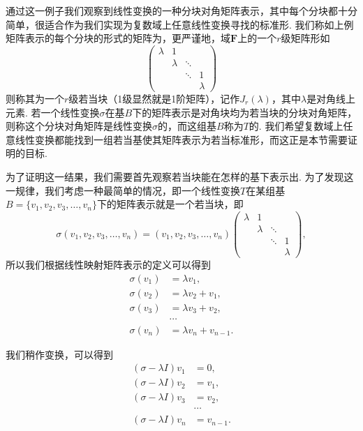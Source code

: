 通过这一例子我们观察到线性变换的一种分块对角矩阵表示，其中每个分块都十分简单，很适合作为我们实现为复数域上任意线性变换寻找的标准形. 我们称如上例矩阵表示的每个分块的形式的矩阵为，更严谨地，域$\mathbf{F}$上的一个$r$级矩阵形如\[\begin{pmatrix}
        \lambda & 1       &        &         \\
                & \lambda & \ddots &         \\
                &         & \ddots & 1       \\
                &         &        & \lambda
    \end{pmatrix}\]
则称其为一个$r$级若当块（1级显然就是1阶矩阵），记作$J_r(\lambda)$，其中$\lambda$是对角线上元素. 若一个线性变换$\sigma$在基$B$下的矩阵表示是对角块均为若当块的分块对角矩阵，则称这个分块对角矩阵是线性变换$\sigma$的，而这组基$B$称为$T$的. 我们希望复数域上任意线性变换都能找到一组若当基使其矩阵表示为若当标准形，而这正是本节需要证明的目标.

为了证明这一结果，我们需要首先观察若当块能在怎样的基下表示出. 为了发现这一规律，我们考虑一种最简单的情况，即一个线性变换$T$在某组基$B=\{v_1,v_2,v_3,\ldots,v_n\}$下的矩阵表示就是一个若当块，即
\[\sigma(v_1,v_2,v_3,\ldots,v_n)=(v_1,v_2,v_3,\ldots,v_n)\begin{pmatrix}
        \lambda & 1       &        &         \\
                & \lambda & \ddots &         \\
                &         & \ddots & 1       \\
                &         &        & \lambda
    \end{pmatrix},\]
所以我们根据线性映射矩阵表示的定义可以得到
\begin{align*}
    \sigma(v_1) & =\lambda v_1,         \\
    \sigma(v_2) & =\lambda v_2+v_1,     \\
    \sigma(v_3) & =\lambda v_3+v_2,     \\
                & \cdots                \\
    \sigma(v_n) & =\lambda v_n+v_{n-1}.
\end{align*}

我们稍作变换，可以得到
\begin{equation} \label{eq:17:若当基的推导}
    \begin{aligned}
        (\sigma-\lambda I)v_1 & =0,       \\
        (\sigma-\lambda I)v_2 & =v_1,     \\
        (\sigma-\lambda I)v_3 & =v_2,     \\
                              & \cdots    \\
        (\sigma-\lambda I)v_n & =v_{n-1}.
    \end{aligned}
\end{equation}

